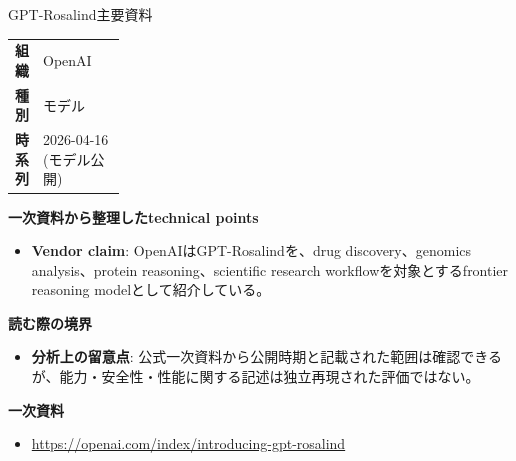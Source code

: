 \begin{technicalnote}{GPT-Rosalind}{主要資料}
\begingroup
\begin{tabularx}{\linewidth}{@{}>{\bfseries}p{0.22\linewidth}X@{}}
組織 & OpenAI \\
種別 & モデル \\
時系列 & 2026-04-16 (モデル公開) \\
\end{tabularx}
\smallskip
{\bfseries 一次資料から整理したtechnical points}
\begin{itemize}[leftmargin=1.5em,itemsep=0.35em]
\item \textbf{Vendor claim}: OpenAIはGPT-Rosalindを、drug discovery、genomics analysis、protein reasoning、scientific research workflowを対象とするfrontier reasoning modelとして紹介している。
\end{itemize}
\begin{minipage}{\linewidth}
{\bfseries 読む際の境界}
\begin{itemize}[leftmargin=1.5em,itemsep=0.35em]
\item \textbf{分析上の留意点}: 公式一次資料から公開時期と記載された範囲は確認できるが、能力・安全性・性能に関する記述は独立再現された評価ではない。
\end{itemize}
\begin{samepage}
{\bfseries 一次資料}
\begingroup\sloppy
\begin{itemize}[leftmargin=1.5em,itemsep=0.25em]
\item {\scriptsize\url{https://openai.com/index/introducing-gpt-rosalind}}
\end{itemize}
\endgroup
\end{samepage}
\end{minipage}
\endgroup
\end{technicalnote}
\medskip

